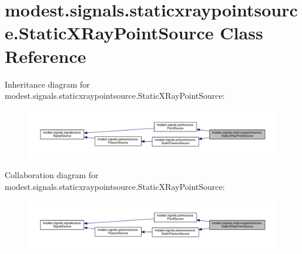 \hypertarget{classmodest_1_1signals_1_1staticxraypointsource_1_1StaticXRayPointSource}{}\section{modest.\+signals.\+staticxraypointsource.\+Static\+X\+Ray\+Point\+Source Class Reference}
\label{classmodest_1_1signals_1_1staticxraypointsource_1_1StaticXRayPointSource}


Inheritance diagram for modest.\+signals.\+staticxraypointsource.\+Static\+X\+Ray\+Point\+Source\+:
\nopagebreak
\begin{figure}[H]
\begin{center}
\leavevmode
\includegraphics[width=350pt]{classmodest_1_1signals_1_1staticxraypointsource_1_1StaticXRayPointSource__inherit__graph}
\end{center}
\end{figure}


Collaboration diagram for modest.\+signals.\+staticxraypointsource.\+Static\+X\+Ray\+Point\+Source\+:
\nopagebreak
\begin{figure}[H]
\begin{center}
\leavevmode
\includegraphics[width=350pt]{classmodest_1_1signals_1_1staticxraypointsource_1_1StaticXRayPointSource__coll__graph}
\end{center}
\end{figure}
